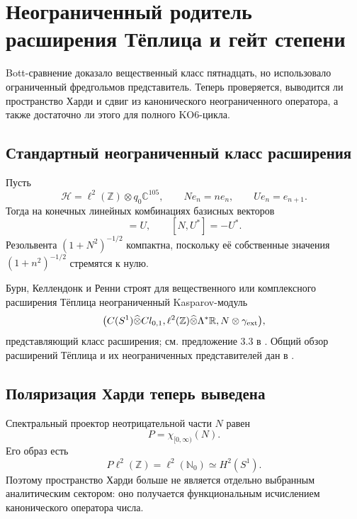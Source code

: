 \chapter{Неограниченный родитель расширения Тёплица и гейт степени}

Bott-сравнение доказало вещественный класс пятнадцать, но использовало
ограниченный фредгольмов представитель. Теперь проверяется, выводится ли
пространство Харди и сдвиг из канонического неограниченного оператора, а
также достаточно ли этого для полного KO6-цикла.

\section{Стандартный неограниченный класс расширения}

Пусть
\begin{equation}
 \mathcal H=\ell^2(\mathbb Z)\otimes q_0\mathbb C^{105},
 \qquad
 Ne_n=ne_n,
 \qquad
 Ue_n=e_{n+1}.
 \label{eq:v5-unbounded-number-shift}
\end{equation}
Тогда на конечных линейных комбинациях базисных векторов
\begin{equation}
 [N,U]=U,
 \qquad
 [N,U^*]=-U^*.
 \label{eq:v5-unbounded-commutators}
\end{equation}
Резольвента $(1+N^2)^{-1/2}$ компактна, поскольку её собственные значения
$(1+n^2)^{-1/2}$ стремятся к нулю.

Бурн, Келлендонк и Ренни строят для вещественного или комплексного
расширения Тёплица неограниченный Kasparov-модуль
\begin{equation}
 \bigl(C(S^1)\widehat\otimes Cl_{0,1},
 \ell^2(\mathbb Z)\widehat\otimes\Lambda^*\mathbb R,
 N\otimes\gamma_{\rm ext}\bigr),
 \label{eq:v5-unbounded-literature-cycle}
\end{equation}
представляющий класс расширения; см. предложение 3.3 в
. Общий обзор расширений Тёплица и их
неограниченных представителей дан в .

\section{Поляризация Харди теперь выведена}

Спектральный проектор неотрицательной части $N$ равен
\begin{equation}
 P=\chi_{[0,\infty)}(N).
 \label{eq:v5-unbounded-spectral-projection}
\end{equation}
Его образ есть
\begin{equation}
 P\ell^2(\mathbb Z)=\ell^2(\mathbb N_0)\simeq H^2(S^1).
\end{equation}
Поэтому пространство Харди больше не является отдельно выбранным
аналитическим сектором: оно получается функциональным исчислением
канонического оператора числа.


